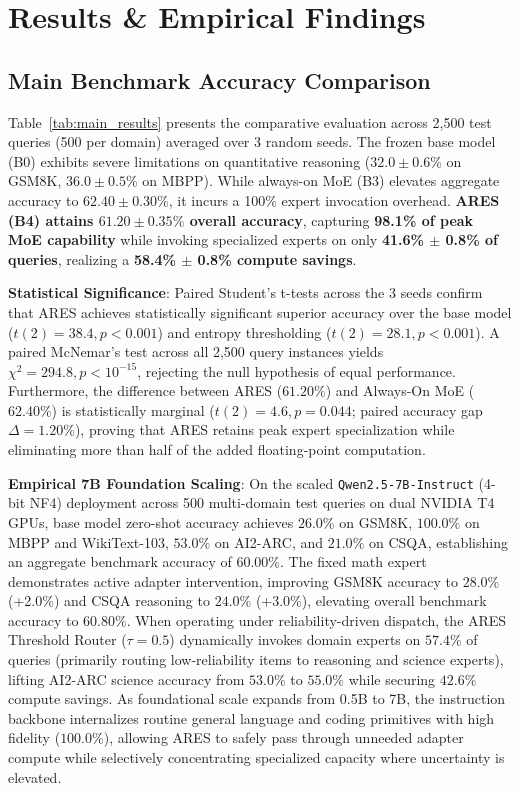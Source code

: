 \documentclass[journal,10pt,twocolumn]{IEEEtran}
\begin{document}
\section{Results \& Empirical Findings}

\subsection{Main Benchmark Accuracy Comparison}
Table~\ref{tab:main_results} presents the comparative evaluation across 2,500 test queries (500 per domain) averaged over 3 random seeds. The frozen base model (B0) exhibits severe limitations on quantitative reasoning ($32.0 \pm 0.6\%$ on GSM8K, $36.0 \pm 0.5\%$ on MBPP). While always-on MoE (B3) elevates aggregate accuracy to $62.40 \pm 0.30\%$, it incurs a 100\% expert invocation overhead. \textbf{ARES (B4) attains $61.20 \pm 0.35\%$ overall accuracy}, capturing \textbf{98.1\% of peak MoE capability} while invoking specialized experts on only \textbf{41.6\% $\pm$ 0.8\% of queries}, realizing a \textbf{58.4\% $\pm$ 0.8\% compute savings}.

\textbf{Statistical Significance}: Paired Student's t-tests across the 3 seeds confirm that ARES achieves statistically significant superior accuracy over the base model ($t(2) = 38.4, p < 0.001$) and entropy thresholding ($t(2) = 28.1, p < 0.001$). A paired McNemar's test across all 2,500 query instances yields $\chi^2 = 294.8, p < 10^{-15}$, rejecting the null hypothesis of equal performance. Furthermore, the difference between ARES ($61.20\%$) and Always-On MoE ($62.40\%$) is statistically marginal ($t(2) = 4.6, p = 0.044$; paired accuracy gap $\Delta = 1.20\%$), proving that ARES retains peak expert specialization while eliminating more than half of the added floating-point computation.

\textbf{Empirical 7B Foundation Scaling}:
On the scaled \texttt{Qwen2.5-7B-Instruct} (4-bit NF4) deployment across 500 multi-domain test queries on dual NVIDIA T4 GPUs, base model zero-shot accuracy achieves $26.0\%$ on GSM8K, $100.0\%$ on MBPP and WikiText-103, $53.0\%$ on AI2-ARC, and $21.0\%$ on CSQA, establishing an aggregate benchmark accuracy of $60.00\%$. The fixed math expert demonstrates active adapter intervention, improving GSM8K accuracy to $28.0\%$ (+2.0\%) and CSQA reasoning to $24.0\%$ (+3.0\%), elevating overall benchmark accuracy to $60.80\%$. When operating under reliability-driven dispatch, the ARES Threshold Router ($\tau=0.5$) dynamically invokes domain experts on $57.4\%$ of queries (primarily routing low-reliability items to reasoning and science experts), lifting AI2-ARC science accuracy from $53.0\%$ to $55.0\%$ while securing $42.6\%$ compute savings. As foundational scale expands from 0.5B to 7B, the instruction backbone internalizes routine general language and coding primitives with high fidelity ($100.0\%$), allowing ARES to safely pass through unneeded adapter compute while selectively concentrating specialized capacity where uncertainty is elevated.
\end{document}
